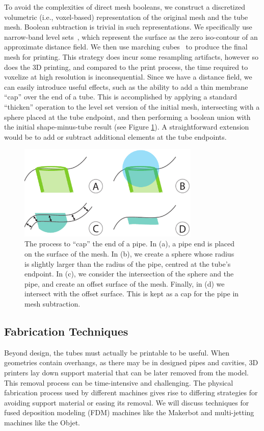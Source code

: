 To avoid the complexities of direct mesh booleans, we construct a discretized volumetric
(i.e., voxel-based) representation of the original mesh and the tube mesh. Boolean
subtraction is trivial in such representations. We specifically use narrow-band
level sets~\cite{Museth04}, which represent the surface as the zero iso-contour of an
approximate distance field.
We then use marching cubes~\cite{Lorensen87} to produce the final mesh for printing.
This strategy does incur some resampling artifacts, however so does the 3D printing, and compared to the print process, the time required to voxelize at high resolution is inconsequential.
Since we have a distance field, we can easily introduce useful effects, such as the
ability to add a thin membrane ``cap'' over the end of a tube. 
This is accomplished by applying a standard ``thicken'' operation to the level set version
of the initial mesh, intersecting with a sphere placed at the tube endpoint, and then performing
a boolean union with the initial shape-minus-tube result (see Figure \ref{fig:cap}).
A straightforward extension would be to add or subtract additional elements at
the tube endpoints.

\begin{figure}[h!]
\centering
    \includegraphics[width=3.4in]{figures/cap.pdf}
\caption{The process to ``cap'' the end of a pipe.  In (a), a pipe end is placed on the surface of the mesh.  In (b), we create a sphere whose radius is slightly larger than the radius of the pipe, centred at the tube's endpoint.  In (c), we consider the intersection of the sphere and the pipe, and create an offset surface of the mesh.  Finally, in (d) we intersect with the offset surface.  This is kept as a cap for the pipe in mesh subtraction.}
\label{fig:cap}
\end{figure}

\subsection{Fabrication Techniques}

Beyond design, the tubes must actually be printable to be useful.  When geometries contain overhangs, as there may be in designed pipes and cavities, 3D printers lay down support material that can be later removed from the model.  This removal process can be time-intensive and challenging.  The physical fabrication process used by different machines gives rise to differing strategies for avoiding support material or easing its removal.  We will discuss techniques for fused deposition modeling (FDM) machines like the Makerbot and multi-jetting machines like the Objet.

